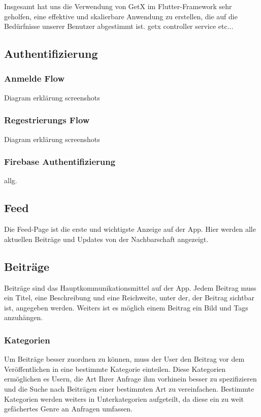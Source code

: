Insgesamt hat uns die Verwendung von GetX im Flutter-Framework sehr geholfen, eine effektive und skalierbare Anwendung zu erstellen, die auf die Bedürfnisse unserer Benutzer abgestimmt ist.
getx controller service etc...


\subsection{Authentifizierung}

\subsubsection{Anmelde Flow}

Diagram
erklärung
screenshots
\subsubsection{Regestrierungs Flow}


Diagram
erklärung
screenshots


\subsubsection{Firebase Authentifizierung}

allg.


\subsection{Feed}
Die Feed-Page ist die erste und wichtigste Anzeige auf der App. Hier werden alle aktuellen Beiträge und Updates von der Nachbarschaft angezeigt.

\subsection{Beiträge}
Beiträge sind das Hauptkommunikationsmittel auf der App. Jedem Beitrag muss ein Titel, eine Beschreibung und eine Reichweite, unter der, der Beitrag sichtbar ist, angegeben werden. Weiters ist es möglich einem Beitrag ein Bild und Tags anzuhängen.

\subsubsection{Kategorien}
Um Beiträge besser zuordnen zu können, muss der User den Beitrag vor dem Veröffentlichen in eine bestimmte Kategorie einteilen. Diese Kategorien ermöglichen es Usern, die Art Ihrer Anfrage ihm vorhinein besser zu spezifizieren und die Suche nach Beiträgen einer bestimmten Art zu vereinfachen. Bestimmte Kategorien werden weiters in Unterkategorien aufgeteilt, da diese ein zu weit gefächertes Genre an Anfragen umfassen.

